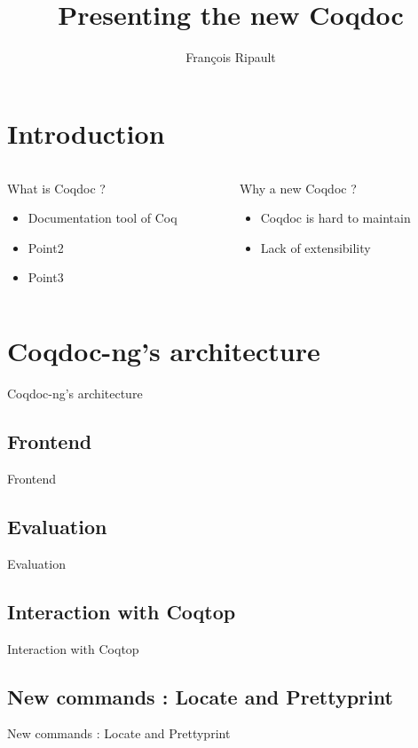 \documentclass[compress]{beamer}
\title{Presenting the new Coqdoc}
\author{François Ripault}
\newenvironment{tframe}[1]{
  \subsection{#1}
  \begin{frame}{#1}
  }{
  \end{frame}
  }
\begin{document}
\begin{frame}
\titlepage
\end{frame}

\section{Introduction}
\begin{frame}
  \begin{columns}[2]

    \begin{column}{0.5\textwidth}
      What is Coqdoc ?
      \begin{itemize}
        \item Documentation tool of Coq
        \item Point2
        \item Point3
      \end{itemize}
    \end{column}

    \begin{column}{0.5\textwidth}
      Why a new Coqdoc ?
      \begin{itemize}[<+->]
        \item Coqdoc is hard to maintain
        \item Lack of extensibility
      \end{itemize}
    \end{column}

  \end{columns}
\end{frame}

\section{Coqdoc-ng's architecture}
  \begin{frame}{Coqdoc-ng's architecture}
    
  \end{frame}

  \begin{tframe}{Frontend}
  \end{tframe}

  \begin{tframe}{Evaluation}
  \end{tframe}


  \begin{tframe}{Interaction with Coqtop}
  \end{tframe}

  \begin{tframe}{New commands : Locate and Prettyprint}
  \end{tframe}
\end{document}
